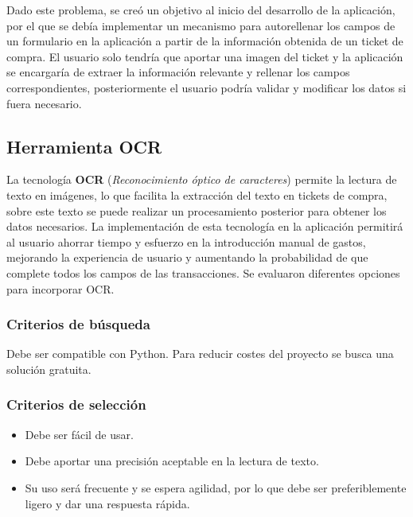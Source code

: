 Dado este problema, se creó un objetivo al inicio del desarrollo de la aplicación, por el que se debía implementar un mecanismo para autorellenar los campos de un formulario en la aplicación a partir de la información obtenida de un ticket de compra. El usuario solo tendría que aportar una imagen del ticket y la aplicación se encargaría de extraer la información relevante y rellenar los campos correspondientes, posteriormente el usuario podría validar y modificar los datos si fuera necesario.

\subsection{Herramienta OCR}
La tecnología \textbf{OCR} (\textit{Reconocimiento óptico de caracteres}) permite la lectura de texto en imágenes, lo que facilita la extracción del texto en tickets de compra, sobre este texto se puede realizar un procesamiento posterior para obtener los datos necesarios. La implementación de esta tecnología en la aplicación permitirá al usuario ahorrar tiempo y esfuerzo en la introducción manual de gastos, mejorando la experiencia de usuario y aumentando la probabilidad de que complete todos los campos de las transacciones. Se evaluaron diferentes opciones para incorporar OCR.

\subsubsection{Criterios de búsqueda}
Debe ser compatible con Python. Para reducir costes del proyecto se busca una solución gratuita. 

\subsubsection{Criterios de selección}
\begin{itemize}
    \item Debe ser fácil de usar.
    \item Debe aportar una precisión aceptable en la lectura de texto.
    \item Su uso será frecuente y se espera agilidad, por lo que debe ser preferiblemente ligero y dar una respuesta rápida.
\end{itemize}


